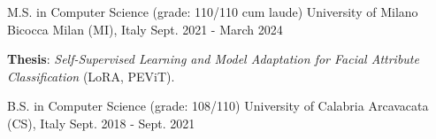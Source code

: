 

\begin{cventries}

\cventry
    {M.S. in Computer Science (grade: 110/110 cum laude)} %
    {University of Milano Bicocca} %
    {Milan (MI), Italy} %
    {Sept. 2021 - March 2024} %
    {
      \begin{cvitems} %
        \item \textbf{Thesis}: \textit{Self-Supervised Learning and Model Adaptation for Facial Attribute Classification} (LoRA, PEViT).
      \end{cvitems}
    }
    
\cventry
    {B.S. in Computer Science (grade: 108/110)} %
    {University of Calabria} %
    {Arcavacata (CS), Italy} %
    {Sept. 2018 - Sept. 2021} %
    {
    }
    



\end{cventries}
